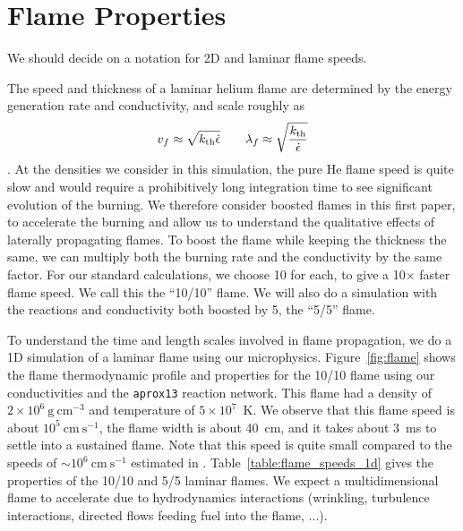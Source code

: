 \documentclass[preprint,times,tighten]{aastex63}
\newcommand{\kth}{k_{\rm th}}
\newcommand{\gcc}{\mathrm{g~cm^{-3} }}
\newcommand{\cms}{\mathrm{cm~s^{-1} }}
\newcommand{\AssignTo}[1]{
    \marginpar{\vskip-\baselineskip%
               \raggedright%
               \tiny\sffamily%
               {\color{blue}\hrule%
               \smallskip%
               #1\par%
               \smallskip%
               \hrule}}%
}
\begin{document}
\section{Flame Properties}\label{Sec:Flame}

{\color{red} We should decide on a notation for 2D and laminar flame speeds.}

The speed and thickness of a laminar helium flame are determined by the
energy generation rate and conductivity, and scale roughly as
\begin{equation}
\label{eq:flame_scaling}
v_f \approx \sqrt{\kth \dot{\epsilon}} \qquad
\lambda_f \approx \sqrt{\frac{\kth}{\dot{\epsilon}}}
\end{equation}
\citep{orourke:1979,khokhlov:1993}.
At the densities we consider in this simulation, the pure He flame
speed is quite slow and would require a prohibitively long integration
time to see significant evolution of the burning.  We therefore
consider boosted flames in this first paper, to accelerate the burning
and allow us to understand the qualitative effects of laterally
propagating flames.  To boost the flame while keeping the thickness
the same, we can multiply both the burning rate and the conductivity
by the same factor.  For our standard calculations, we choose 10 for
each, to give a 10$\times$ faster flame speed.  We call this the ``10/10''
flame.  We will also do a simulation with the reactions and
conductivity both boosted by 5, the ``5/5'' flame.

To understand the time and length scales involved in flame
propagation, we do a 1D simulation of a laminar flame using our
microphysics.  Figure~\ref{fig:flame} shows the flame thermodynamic
profile and properties for the 10/10 flame using
our conductivities and the {\tt aprox13} reaction network.  This flame
had a density of $2\times 10^6~\gcc$ and
temperature of $5\times 10^7$~K.  We observe that this flame speed is
about $10^5~\cms$, the flame width is about 40~cm, and it
takes about 3~ms to settle into a sustained flame.  Note that this speed
is quite small compared to the speeds of $\sim 10^6~\cms$ estimated in
\citet{spitkovsky2002}.  Table~\ref{table:flame_speeds_1d} gives the properties
of the 10/10 and 5/5 laminar flames.  We expect a multidimensional flame to
accelerate due to hydrodynamics interactions (wrinkling, turbulence
interactions, directed flows feeding fuel into the flame, ...).


\begin{figure*}[t]
\caption{\label{fig:flame} Time-evolution of the 10$\times$ boosted 1D
	laminar flame. The left plot shows temperature and nuclear energy
	generation profiles at 11 different times, while the right plot
	shows flame propagation speed and flame thickness as functions of time.}
\end{figure*}
\end{document}
